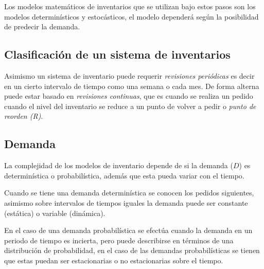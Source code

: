 Los modelos matemáticos de inventarios que se utilizan bajo estos pasos son los modelos determinísticos y estocásticos, el modelo dependerá según la posibilidad de predecir la demanda. \citep{hillier2003introduccion}

\subsection{Clasificación de un sistema de inventarios}

Asimismo un sistema de inventario puede requerir \textsl{revisiones periódicas} es decir en un cierto intervalo de tiempo como una semana o cada mes. De forma alterna puede estar basado en \textsl{revisiones continuas}, que es cuando se realiza un pedido cuando el nivel del inventario se reduce a un punto de volver a pedir o \textsl{punto de reorden (R)}.

\subsection{Demanda}
La complejidad de los modelos de inventario depende de si la demanda ($D$) es determinística o probabilística, además que esta pueda variar con el tiempo. \citep{hillier2003introduccion}

Cuando se tiene una demanda determinística se conocen los pedidos siguientes, asimismo sobre intervalos de tiempos iguales la demanda puede ser constante (estática) o variable (dinámica).

En el caso de una demanda probabilística se efectúa cuando la demanda en un periodo de tiempo es incierta, pero puede describirse en términos de una distribución de probabilidad, en el caso de las demandas probabilísticas se tienen que estas puedan ser estacionarias o no estacionarias sobre el tiempo.


